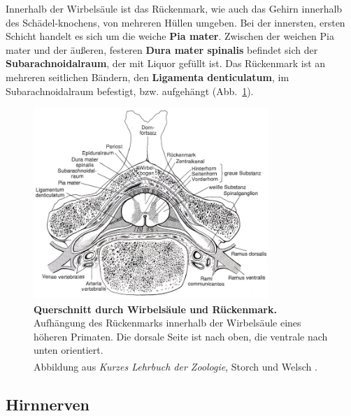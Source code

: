 \documentclass[12pt,a4paper,pdftex]{article}
\begin{document}
\noindent Innerhalb der Wirbelsäule ist das Rückenmark, wie auch das Gehirn innerhalb des Schädel-knochens, von mehreren Hüllen umgeben. Bei der innersten, ersten Schicht handelt es sich um die weiche \textbf{Pia mater}. Zwischen der weichen Pia mater und der äußeren, festeren \textbf{Dura mater spinalis} befindet sich der \textbf{Subarachnoidalraum}, der mit Liquor gefüllt ist. Das Rückenmark ist an mehreren seitlichen Bändern, den \textbf{Ligamenta denticulatum}, im Subarachnoidalraum befestigt, bzw. aufgehängt (Abb.~\ref{fig:ruckenmark_wirbelsaeule}). 

\begin{figure}[H]
     \centering
     \includegraphics[width=0.79\textwidth]{pictures/Bilder_Jule/Andere/rueckenmark_wirbelsaeule.png}
     \caption[Querschnitt durch Wirbelsäule und Rückenmark]{\textbf{Querschnitt durch Wirbelsäule und Rückenmark.} Aufhängung des Rückenmarks innerhalb der Wirbelsäule eines höheren Primaten. Die dorsale Seite ist nach oben, die ventrale nach unten orientiert.\\
     Abbildung aus \textit{Kurzes Lehrbuch der Zoologie}, Storch und Welsch \textsuperscript{\cite[6]{storch2012lehrbuchzoo}}.}
     \label{fig:ruckenmark_wirbelsaeule}
\end{figure}


\subsection{Hirnnerven}
\label{subsec:Hirnnnerven}
\end{document}
